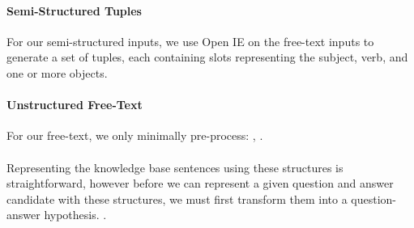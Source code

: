 \paragraph{Semi-Structured Tuples}

For our semi-structured inputs, we use Open IE  \cite{Banko2007OpenIE} on the free-text inputs to generate a set of tuples, each containing  slots representing the subject, verb, and one or more objects.    
 

\paragraph{Unstructured Free-Text}

For our free-text, we only minimally pre-process: , .

\paragraph{}
Representing the knowledge base sentences using these structures is straightforward, however before we can represent a given question and answer candidate with these structures, we must first transform them into a question-answer hypothesis.  .
